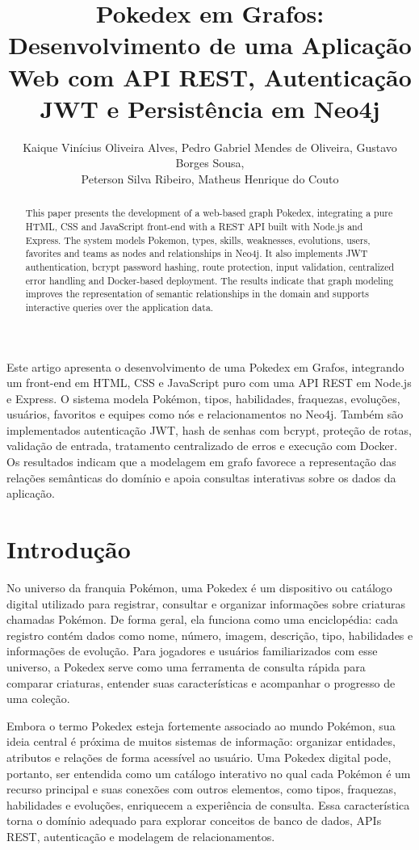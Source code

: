 \documentclass[12pt]{article}
\title{Pokedex em Grafos: Desenvolvimento de uma Aplicação Web com API REST, Autenticação JWT e Persistência em Neo4j}
\author{
Kaique Vinícius Oliveira Alves\inst{1},
Pedro Gabriel Mendes de Oliveira\inst{1},
Gustavo Borges Sousa\inst{1},\\
Peterson Silva Ribeiro\inst{1},
Matheus Henrique do Couto\inst{1}
}
\begin{document}
\maketitle

\begin{abstract}
This paper presents the development of a web-based graph Pokedex, integrating a pure HTML, CSS and JavaScript front-end with a REST API built with Node.js and Express. The system models Pokemon, types, skills, weaknesses, evolutions, users, favorites and teams as nodes and relationships in Neo4j. It also implements JWT authentication, bcrypt password hashing, route protection, input validation, centralized error handling and Docker-based deployment. The results indicate that graph modeling improves the representation of semantic relationships in the domain and supports interactive queries over the application data.
\end{abstract}

\begin{resumo}
Este artigo apresenta o desenvolvimento de uma Pokedex em Grafos, integrando um front-end em HTML, CSS e JavaScript puro com uma API REST em Node.js e Express. O sistema modela Pokémon, tipos, habilidades, fraquezas, evoluções, usuários, favoritos e equipes como nós e relacionamentos no Neo4j. Também são implementados autenticação JWT, hash de senhas com bcrypt, proteção de rotas, validação de entrada, tratamento centralizado de erros e execução com Docker. Os resultados indicam que a modelagem em grafo favorece a representação das relações semânticas do domínio e apoia consultas interativas sobre os dados da aplicação.
\end{resumo}

\section{Introdução}

No universo da franquia Pokémon, uma Pokedex é um dispositivo ou catálogo digital utilizado para registrar, consultar e organizar informações sobre criaturas chamadas Pokémon. De forma geral, ela funciona como uma enciclopédia: cada registro contém dados como nome, número, imagem, descrição, tipo, habilidades e informações de evolução. Para jogadores e usuários familiarizados com esse universo, a Pokedex serve como uma ferramenta de consulta rápida para comparar criaturas, entender suas características e acompanhar o progresso de uma coleção.

Embora o termo Pokedex esteja fortemente associado ao mundo Pokémon, sua ideia central é próxima de muitos sistemas de informação: organizar entidades, atributos e relações de forma acessível ao usuário. Uma Pokedex digital pode, portanto, ser entendida como um catálogo interativo no qual cada Pokémon é um recurso principal e suas conexões com outros elementos, como tipos, fraquezas, habilidades e evoluções, enriquecem a experiência de consulta. Essa característica torna o domínio adequado para explorar conceitos de banco de dados, APIs REST, autenticação e modelagem de relacionamentos.
\end{document}
